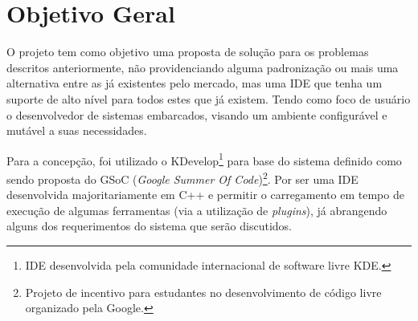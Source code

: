 \section{Objetivo Geral}

O projeto tem como objetivo uma proposta de solução para os problemas descritos anteriormente, não providenciando alguma padronização ou mais uma alternativa entre as já existentes pelo mercado, mas uma IDE que tenha um suporte de alto nível para todos estes que já existem. Tendo como foco de usuário o desenvolvedor de sistemas embarcados, visando um ambiente configurável e mutável a suas necessidades.

Para a concepção, foi utilizado o KDevelop\footnote{IDE desenvolvida pela comunidade internacional de software livre KDE.} para base do sistema definido como sendo proposta do GSoC (\textit{Google Summer Of Code})\footnote{Projeto de incentivo para estudantes no desenvolvimento de código livre organizado pela Google.}. Por ser uma IDE desenvolvida majoritariamente em C++ e permitir o carregamento em tempo de execução de algumas ferramentas (via a utilização de \textit{plugins}), já abrangendo alguns dos requerimentos do sistema que serão discutidos.

\iffalse
O objetivo geral deve responder as seguintes perguntas:
1) O que a sua organização deseja realizar com o Projeto?
2) Qual problema em especial se quer solucionar?
3) Que mudanças se quer alcançar?
4) Que diferença o projeto quer fazer?

Deve ser escrito em tempo infinitivo (por exemplo: ampliar, capacitar, entre outros) e redigido com claridade. O objetivo precisa ser alcançável, não pode ser genérico, de forma que o projeto não consiga resolver (ex: terminar com a fome no mundo). Por outro lado deve ser ousado, capaz de sinalizar mudanças mais profundas que poderão ser alcançadas pelo projeto a médio e longo prazo.
\fi

